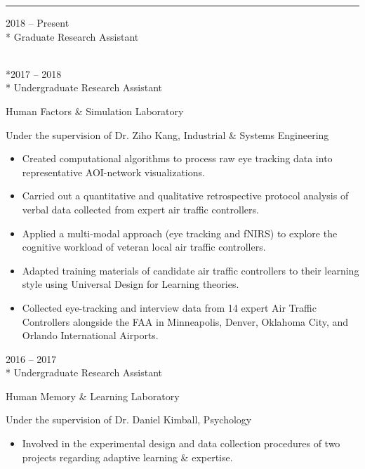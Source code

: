 \documentclass[a4paper,10pt]{article}
\newlength{\cvcolumngapwidth}
\newlength{\cvleftcolumnwidth}
\newlength{\cvrightcolumnwidth}
\newcommand{\cvsectionstyle}[1]{{\cvsectionfont\textcolor{cvsectioncolor}{#1}}}
\newcommand{\cvtitlestyle}[1]{{\large\cvtitlefont\textcolor{cvtitlecolor}{#1}}}
\newcommand{\cvdurationstyle}[1]{{\small\cvdurationfont\textcolor{cvdurationcolor}{#1}}}
\newlength{\cvafteritemskipamount}
\newlength{\cvaftersectionskipamount}
\newlength{\cvaftertitleskipamount}
\newlength{\cvparskip}
\newcommand{\cvsection}[1]{
    \begin{minipage}[t]{\cvleftcolumnwidth}
        \raggedleft\cvsectionstyle{#1}
    \end{minipage}%
    \hspace{\cvcolumngapwidth}%
    \begin{minipage}[t]{\cvrightcolumnwidth}
        \textcolor{cvrulecolor}{\rule{\cvrightcolumnwidth}{0.3mm}}
    \end{minipage}

    \vspace{\cvaftersectionskipamount}
}
\newcommand{\cvitem}[2]{
    \begin{minipage}[t]{\cvleftcolumnwidth}
        \raggedleft #1
    \end{minipage}%
    \hspace{\cvcolumngapwidth}%
    \begin{minipage}[t]{\cvrightcolumnwidth}
        \setlength{\parskip}{\cvparskip} #2
    \end{minipage}

    \vspace{\cvafteritemskipamount}
}
\newcommand{\cvtitle}[1]{
    \cvtitlestyle{#1}

    \vspace{\cvaftertitleskipamount}
    \vspace{-\cvparskip}
}
\begin{document}
\cvsection{RESEARCH EXPERIENCE}
\vspace{0.15cm}

\cvitem{
\cvdurationstyle{2018 -- Present}
\\* Graduate Research Assistant
\vspace{0.15cm}

\\*\cvdurationstyle{2017 -- 2018}
\\* Undergraduate Research Assistant
}{
    \cvtitle{Human Factors \& Simulation Laboratory}

    Under the supervision of Dr. Ziho Kang, Industrial \& Systems Engineering
    \vspace{0.15cm}
    
    \begin{itemize}[leftmargin=*]
    
        \item Created computational algorithms to process raw eye tracking data into representative AOI-network visualizations.
        \item Carried out a quantitative and qualitative retrospective protocol analysis of verbal data collected from expert air traffic controllers.
        \item Applied a multi-modal approach (eye tracking and fNIRS) to explore the cognitive workload of veteran local air traffic controllers.
        \item Adapted training materials of candidate air traffic controllers to their learning style using Universal Design for Learning theories.
        \item Collected eye-tracking and interview data from 14 expert Air Traffic Controllers alongside the FAA in Minneapolis, Denver, Oklahoma City, and Orlando International Airports.
        
    \end{itemize}
    
}

\cvitem{
\cvdurationstyle{2016 -- 2017}
\\* Undergraduate Research Assistant
}{
    \cvtitle{Human Memory \& Learning Laboratory}

    Under the supervision of Dr. Daniel Kimball, Psychology
    \vspace{0.15cm}
    
    \begin{itemize}[leftmargin=*]
        \item Involved in the experimental design and data collection procedures of two projects regarding adaptive learning \& expertise.
    \end{itemize}
    
}
\end{document}

